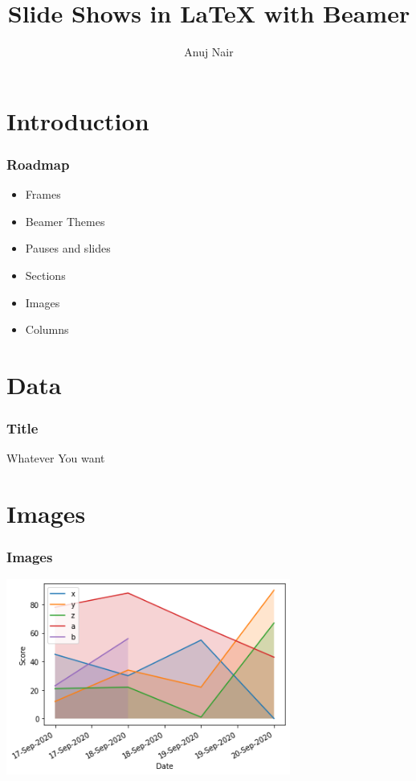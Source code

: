 \documentclass{beamer}
\title{Slide Shows in {\LaTeX} with Beamer}
\author{Anuj Nair}
\begin{document}
\maketitle

\section{Introduction}

\begin{frame}
				\frametitle{Roadmap}
				\begin{itemize}
								\item Frames\pause
								\item Beamer Themes\pause
								\item Pauses and slides\pause
								\item Sections\pause
								\item Images\pause
								\item Columns\pause
				\end{itemize}
\end{frame}


\section{Data}

\begin{frame}
				\frametitle{Title}
				Whatever You want
\end{frame}

\section{Images}

\begin{frame}
				\frametitle{Images}
				\includegraphics[width=0.7\textwidth,keepaspectratio,angle=270]{5_beamerPPT.png}
\end{frame}
\end{document}
